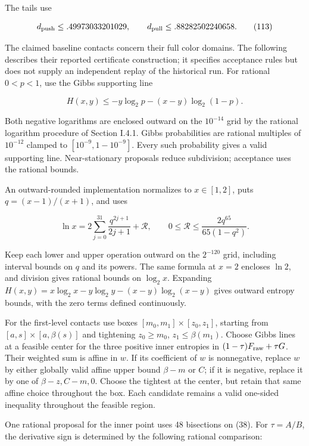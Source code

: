 The tails use

\[
d_{\rm push}\le .49973033201029,\qquad
 d_{\rm pull}\le .88282502240658.
\tag{113}
\]

The claimed baseline contacts concern their full color domains. The following describes their reported certificate construction; it specifies acceptance rules but does not supply an independent replay of the historical run. For rational \(0<p<1\), use the Gibbs supporting line

\[
H(x,y)\le -y\log_2p-(x-y)\log_2(1-p).
\tag{114}
\]

Both negative logarithms are enclosed outward on the \(10^{-14}\) grid by the rational logarithm procedure of Section I.4.1. Gibbs probabilities are rational multiples of \(10^{-12}\) clamped to \([10^{-9},1-10^{-9}]\). Every such probability gives a valid supporting line. Near-stationary proposals reduce subdivision; acceptance uses the rational bounds.

An outward-rounded implementation normalizes to \(x\in[1,2]\), puts \(q=(x-1)/(x+1)\), and uses

\[
\ln x=2\sum_{j=0}^{31}\frac{q^{2j+1}}{2j+1}+\mathcal R,
\qquad0\le\mathcal R\le\frac{2q^{65}}{65(1-q^2)}.
\tag{115}
\]

Keep each lower and upper operation outward on the \(2^{-120}\) grid, including interval bounds on \(q\) and its powers. The same formula at \(x=2\) encloses \(\ln2\), and division gives rational bounds on \(\log_2x\). Expanding \(H(x,y)=x\log_2x-y\log_2y-(x-y)\log_2(x-y)\) gives outward entropy bounds, with the zero terms defined continuously.

For the first-level contacts use boxes \([m_0,m_1]\times[z_0,z_1]\), starting from \([a,s]\times[a,\beta(s)]\) and tightening \(z_0\ge m_0\), \(z_1\le\beta(m_1)\). Choose Gibbs lines at a feasible center for the three positive inner entropies in \((1-\tau)F_{\rm raw}+\tau G\). Their weighted sum is affine in \(w\). If its coefficient of \(w\) is nonnegative, replace \(w\) by either globally valid affine upper bound \(\beta-m\) or \(C\); if it is negative, replace it by one of \(\beta-z,C-m,0\). Choose the tightest at the center, but retain that same affine choice throughout the box. Each candidate remains a valid one-sided inequality throughout the feasible region.

One rational proposal for the inner point uses 48 bisections on (38). For \(\tau=A/B\), the derivative sign is determined by the following rational comparison:

